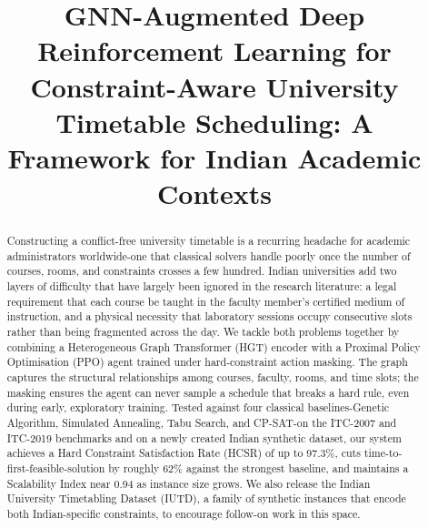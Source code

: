 \documentclass[conference]{IEEEtran}
\begin{document}
\title{GNN-Augmented Deep Reinforcement Learning for Constraint-Aware
University Timetable Scheduling: A Framework for Indian Academic Contexts}

\author{
\and
{}
}

\maketitle

\begin{abstract}
Constructing a conflict-free university timetable is a recurring headache for academic administrators worldwide-one that classical solvers handle poorly once the number of courses, rooms, and constraints crosses a few hundred. Indian universities add two layers of difficulty that have largely been ignored in the research literature: a legal requirement that each course be taught in the faculty member's certified medium of instruction, and a physical necessity that laboratory sessions occupy consecutive slots rather than being fragmented across the day. We tackle both problems together by combining a Heterogeneous Graph Transformer (HGT) encoder with a Proximal Policy Optimisation (PPO) agent trained under hard-constraint action masking. The graph captures the structural relationships among courses, faculty, rooms, and time slots; the masking ensures the agent can never sample a schedule that breaks a hard rule, even during early, exploratory training. Tested against four classical baselines-Genetic Algorithm, Simulated Annealing, Tabu Search, and CP-SAT-on the ITC-2007 and ITC-2019 benchmarks and on a newly created Indian synthetic dataset, our system achieves a Hard Constraint Satisfaction Rate (HCSR) of up to 97.3\%, cuts time-to-first-feasible-solution by roughly 62\% against the strongest baseline, and maintains a Scalability Index near 0.94 as instance size grows. We also release the Indian University Timetabling Dataset (IUTD), a family of synthetic instances that encode both Indian-specific constraints, to encourage follow-on work in this space.
\end{abstract}
\end{document}
